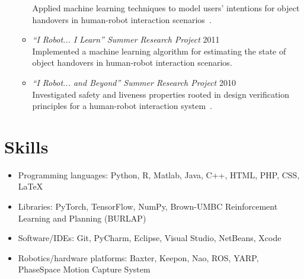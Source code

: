 \documentclass[10pt,letterpaper]{article}
\newcommand{\thing}[2]{{#1} \hfill {#2}}
\begin{document}
\begin{itemize}
\begin{itemize}
	Applied machine learning techniques to model users' intentions for object handovers in human-robot interaction scenarios~\cite{grigore2013joint}.
	\item \thing{\it ``I Robot... I Learn'' Summer Research Project}{2011}\vspace{-0.1em}\\
	Implemented a machine learning algorithm for estimating the state of object handovers in human-robot interaction scenarios.
	\item \thing{\it ``I Robot... and Beyond'' Summer Research Project}{2010}\vspace{-0.1em}\\
	 Investigated safety and liveness properties rooted in design verification principles for a human-robot interaction system~\cite{grigore2011towards}. 
	\end{itemize}
\end{itemize}

\section{Skills}
\begin{itemize}%
\item Programming languages: Python, R, Matlab, Java, C++, HTML, PHP, CSS, LaTeX
\item Libraries: PyTorch, TensorFlow, NumPy, Brown-UMBC Reinforcement Learning and Planning (BURLAP)
\item Software/IDEs: Git, PyCharm, Eclipse, Visual Studio, NetBeans, Xcode
\item Robotics/hardware platforms: Baxter, Keepon, Nao, ROS, YARP, PhaseSpace Motion Capture System
\end{itemize}
\end{document}
